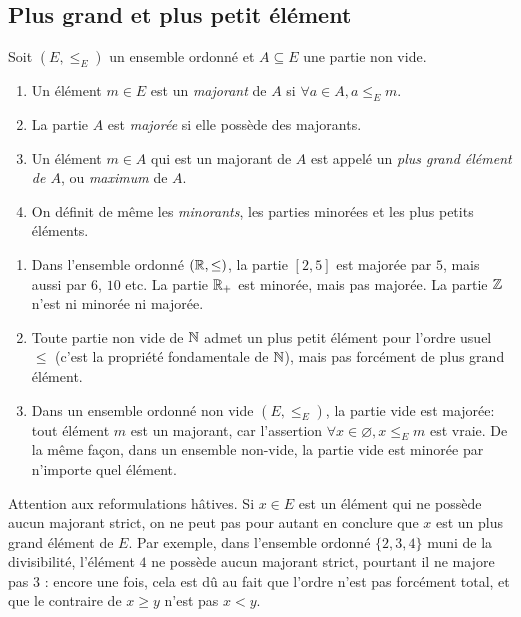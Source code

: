 \subsection{Plus grand et plus petit élément}
\begin{definition}
Soit $(E,\leq_E)$ un ensemble ordonné et $A\subseteq E$ une partie non vide.
\begin{enumerate}
\item Un élément $m\in E$ est un \emph{majorant} de $A$ si $\forall a\in A, a\leq_E m$.
\item La partie $A$ est \emph{majorée} si elle possède des majorants.
\item Un élément $m\in A$ qui est un majorant de $A$ est appelé un \emph{plus grand élément de $A$}, ou \emph{maximum} de $A$.
\item On définit de même les \emph{minorants}, les parties minorées et les plus petits éléments.
\end{enumerate}
\end{definition}

\begin{exemple}
\begin{enumerate}[label=\alph*)]
\item Dans l'ensemble ordonné $(\mathbb{R},\leq)$, la partie $[2,5]$ est majorée par $5$, mais aussi par $6$, $10$ etc. La partie $\mathbb{R}_+$ est minorée, mais pas majorée. La partie $\mathbb{Z}$ n'est ni minorée ni majorée.
\item Toute partie non vide de $\mathbb{N}$ admet un plus petit élément pour l'ordre usuel $\leq$ (c'est la propriété fondamentale de $\mathbb{N}$), mais pas forcément de plus grand élément.
\item Dans un ensemble ordonné non vide $(E,\leq_E)$, la partie vide est majorée: tout élément $m$ est un majorant, car l'assertion $\forall x\in \varnothing, x\leq_E m$ est vraie. De la même façon, dans un ensemble non-vide, la partie vide est minorée par n'importe quel élément.
\end{enumerate}
\end{exemple}

\begin{remarque}
Attention aux reformulations hâtives. Si $x\in E$ est un élément qui ne possède aucun majorant strict, on ne peut pas pour autant en conclure que $x$ est un plus grand élément de $E$. Par exemple, dans l'ensemble ordonné $\{2,3,4\}$ muni de la divisibilité, l'élément $4$ ne possède aucun majorant strict, pourtant il ne majore pas $3$ : encore une fois, cela est dû au fait que l'ordre n'est pas forcément total, et que le contraire de $x\geq y$ n'est pas $x<y$.
\end{remarque}



